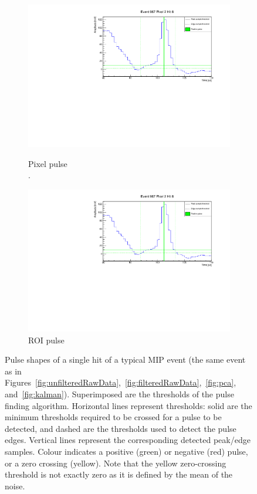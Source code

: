 \documentclass[instruments,article,submit,moreauthors,pdftex]{Definitions/mdpi}
\begin{document}
\begin{figure}[htb]
	\centering
	\begin{subfigure}{\textwidth}
		\centering
		\includegraphics[viewport=0 0 550 290, clip, width=\textwidth, page=1]{event967_pixel2_hit8}\\
		\caption{Pixel pulse\\.}
		\label{fig:hitFinder_a}
	\end{subfigure}
	\begin{subfigure}{\textwidth}
		\centering
		\includegraphics[viewport=0 0 550 290, clip, width=\textwidth, page=3]{event967_pixel2_hit8}
		\caption{ROI pulse}
		\label{fig:hitFinder_b}
	\end{subfigure}
	\caption{Pulse shapes of a single hit of a typical MIP event (the same event as in Figures~\ref{fig:unfilteredRawData},~\ref{fig:filteredRawData},~\ref{fig:pca}, and~\ref{fig:kalman}).
		Superimposed are the thresholds of the pulse finding algorithm.
		Horizontal lines represent thresholds: solid are the minimum thresholds required to be crossed for a pulse to be detected, and dashed are the thresholds used to detect the pulse edges.
		Vertical lines represent the corresponding detected peak/edge samples.
		Colour indicates a positive (green) or negative (red) pulse, or a zero crossing (yellow).
		Note that the yellow zero-crossing threshold is not exactly zero as it is defined by the mean of the noise.}
	\label{fig:hitFinder}
\end{figure}
\end{document}
